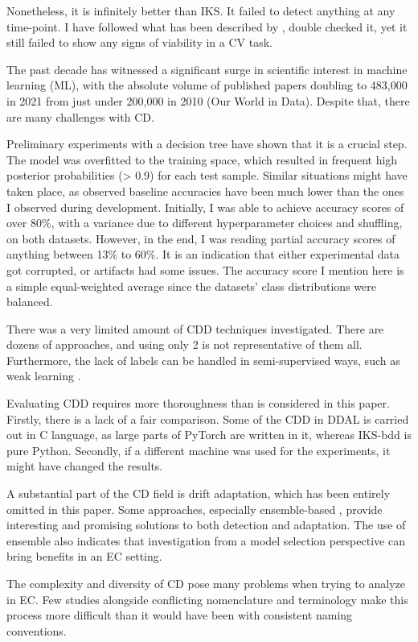 \documentclass[a4paper]{article}
\begin{document}
Nonetheless, it is infinitely better than IKS. It failed to detect anything at any time-point. I have followed what has been described by \cite{dos_reis_fast_2016}, double checked it, yet it still failed to show any signs of viability in a CV task.

The past decade has witnessed a significant surge in scientific interest in machine learning (ML), with the absolute volume of published papers doubling to 483,000 in 2021 from just under 200,000 in 2010 (Our World in Data). Despite that, there are many challenges with CD.

Preliminary experiments with a decision tree have shown that it is a crucial step. The model was overfitted to the training space, which resulted in frequent high posterior probabilities (> 0.9) for each test sample. Similar situations might have taken place, as observed baseline accuracies have been much lower than the ones I observed during development. Initially, I was able to achieve accuracy scores of over 80\%, with a variance due to different hyperparameter choices and shuffling, on both datasets. However, in the end, I was reading partial accuracy scores of anything between 13\% to 60\%. It is an indication that either experimental data got corrupted, or artifacts had some issues. The accuracy score I mention here is a simple equal-weighted average since the datasets' class distributions were balanced.

There was a very limited amount of CDD techniques investigated. There are dozens of approaches, and using only 2 is not representative of them all. Furthermore, the lack of labels can be handled in semi-supervised ways, such as weak learning \cite{wang_ordisco_2021}.

Evaluating CDD requires more thoroughness than is considered in this paper. Firstly, there is a lack of a fair comparison. Some of the CDD in DDAL is carried out in C language, as large parts of PyTorch are written in it, whereas IKS-bdd is pure Python. Secondly, if a different machine was used for the experiments, it might have changed the results.

A substantial part of the CD field is drift adaptation, which has been entirely omitted in this paper. Some approaches, especially ensemble-based \cite{krawczyk_ensemble_2017}, provide interesting and promising solutions to both detection and adaptation. The use of ensemble also indicates that investigation from a model selection perspective can bring benefits in an EC setting.

The complexity and diversity of CD pose many problems when trying to analyze in EC. Few studies alongside conflicting nomenclature and terminology make this process more difficult than it would have been with consistent naming conventions.
\end{document}
